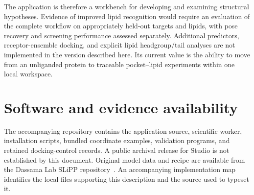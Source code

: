 \documentclass[10pt,a4paper]{article}
\begin{document}
The application is therefore a workbench for developing and examining structural hypotheses. Evidence of improved lipid recognition would require an evaluation of the complete workflow on appropriately held-out targets and lipids, with pose recovery and screening performance assessed separately. Additional predictors, receptor-ensemble docking, and explicit lipid headgroup/tail analyses are not implemented in the version described here. Its current value is the ability to move from an unliganded protein to traceable pocket--lipid experiments within one local workspace.

\section*{Software and evidence availability}
The accompanying repository contains the application source, scientific worker, installation scripts, bundled coordinate examples, validation programs, and retained docking-control records. A public archival release for Studio is not established by this document. Original model data and recipe are available from the Dassama Lab SLiPP repository~\cite{slippcode}. An accompanying implementation map identifies the local files supporting this description and the source used to typeset it.
\end{document}
